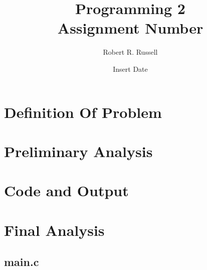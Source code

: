 \documentclass[letterpaper,oneside]{scrartcl}
\title{Programming 2\\Assignment Number}
\author{Robert R. Russell}
\date{Insert Date}
\begin{document}
\maketitle

\section{Definition Of Problem}

\section{Preliminary Analysis}

\section{Code and Output}

\section{Final Analysis}

\subsection{main.c}
\end{document}
